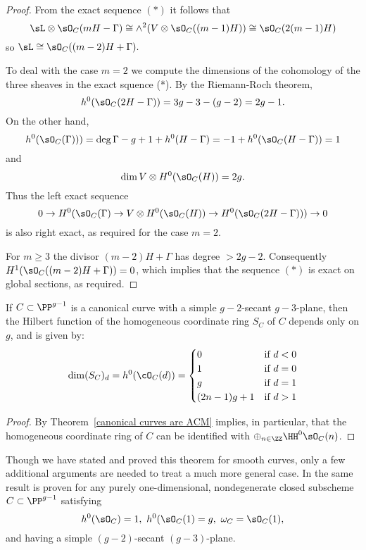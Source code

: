 \begin{proof}
From the exact sequence $(*)$ it follows that
$$
\sL\otimes \sO_{C}(mH-\Gamma) \cong  \wedge^2(V\otimes \sO_C((m-1)H) ) \cong \sO_C(2(m-1)H) 
$$
so $\sL \cong \sO_C((m-2)H+\Gamma).$ 


To deal with the case $m=2$ we compute the dimensions of the cohomology of the three sheaves in the exact squence (*).
By the Riemann-Roch theorem,
$$
h^0(\sO_C(2H-\Gamma)) = 3g-3 - (g-2) = 2g-1.
$$ 
On the other hand,
$$
h^0(\sO_C(\Gamma)))=\deg \Gamma -g+1+h^0(H-\Gamma) = -1 + h^0(\sO_C(H-\Gamma)) = 1
$$
and 
$$
\dim V \otimes H^0(\sO_C(H)) = 2g.
$$
Thus the left exact sequence
$$
0\to H^0(\sO_{C}(\Gamma)  \to V\otimes H^0(\sO_C(H)) \to H^0( \sO_{C}(2H-\Gamma))) \to 0
$$
is also right exact, as required for the case $m=2$.

For $m\geq 3$ the divisor $(m-2)H+\Gamma$ has degree $>2g-2$. Consequently
$H^1(\sO_{C}((m-2)H+\Gamma)) = 0$, which implies that the sequence $(*)$ is
exact on global sections, as required.
\end{proof}

\begin{corollary}\label{canonical hilbert function}
If $C\subset \PP^{g-1}$ is a canonical curve with a simple $g-2$-secant $g-3$-plane, then the Hilbert function of the homogeneous coordinate ring $S_{C}$ of  $C$ depends only on $g$, and is given by:
$$
\dim({S_{C}})_{d} = h^{0}(\cO_{C}(d)) = 
\begin{cases}
 0 &\mbox {if } d<0\\
 1 & \mbox {if }  d=0\\
 g & \mbox {if }  d=1\\
 (2n-1)g+1 & \mbox {if }  d>1\\
\end{cases}
$$
\end{corollary}
\begin{proof}
By Theorem~\ref{canonical curves are ACM} implies, in particular, that the homogeneous coordinate ring of $C$ can be identified with $\oplus_{n\in \ZZ}\HH^0\sO_C(n)$.  
\end{proof}

\begin{fact}
Though we have stated and proved this theorem for smooth curves,
only a few additional arguments are needed to treat a much more  general case. In \cite{Schreyer} 
the same result is proven for
any purely one-dimensional, nondegenerate closed subscheme $C\subset \PP^{g-1}$ satisfying
$$
 h^{0}(\sO_{C}) = 1,\ h^{0}(\sO_{C}(1) = g, \ \omega_{C} = \sO_{C}(1),
$$ 
and having a simple $(g-2)$-secant $(g-3)$-plane.
\end{fact}
 
